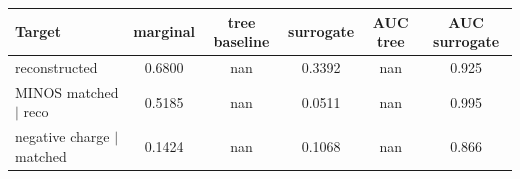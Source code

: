 \begin{tabular}{lccccc}
\toprule
Target & marginal & tree baseline & surrogate & AUC tree & AUC surrogate \\
\midrule
reconstructed & 0.6800 & nan & 0.3392 & nan & 0.925 \\
MINOS matched $\mid$ reco & 0.5185 & nan & 0.0511 & nan & 0.995 \\
negative charge $\mid$ matched & 0.1424 & nan & 0.1068 & nan & 0.866 \\
\bottomrule
\end{tabular}

